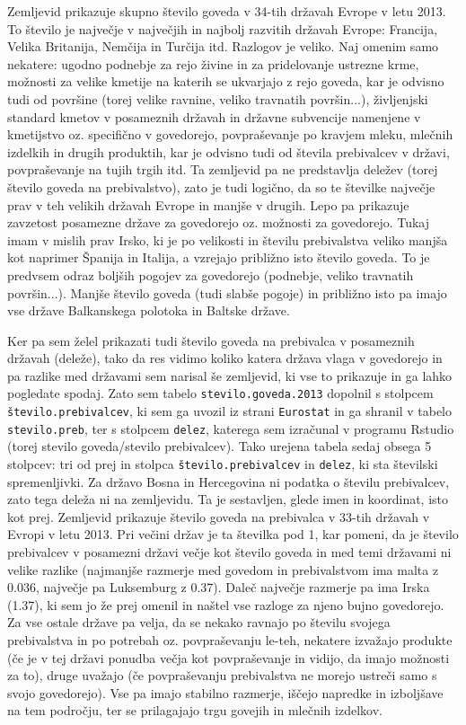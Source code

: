 \documentclass[11pt,a4paper]{article}
\begin{document}
\noindent Zemljevid prikazuje skupno število goveda v 34-tih državah Evrope v letu 2013. To število je največje v največjih in najbolj razvitih državah Evrope: Francija, Velika Britanija, Nemčija in Turčija itd. Razlogov je veliko. Naj omenim samo nekatere: ugodno podnebje za rejo živine in za pridelovanje ustrezne krme, možnosti za velike kmetije na katerih se ukvarjajo z rejo goveda, kar je odvisno tudi od površine (torej velike ravnine, veliko travnatih površin...), življenjski standard kmetov v posameznih državah in državne subvencije namenjene v kmetijstvo oz. specifično v govedorejo, povpraševanje po kravjem mleku, mlečnih izdelkih in drugih produktih, kar je odvisno tudi od števila prebivalcev v državi, povpraševanje na tujih trgih itd. Ta zemljevid pa ne predstavlja deležev (torej število goveda na prebivalstvo), zato je tudi logično, da so te številke največje prav v teh velikih državah Evrope in manjše v drugih. Lepo pa prikazuje zavzetost posamezne države za govedorejo oz. možnosti za govedorejo. Tukaj imam v mislih prav Irsko, ki je po velikosti in številu prebivalstva veliko manjša kot naprimer Španija in Italija, a vzrejajo približno isto število goveda. To je predvsem odraz boljših pogojev za govedorejo (podnebje, veliko travnatih površin...). Manjše število goveda (tudi slabše pogoje) in približno isto pa imajo vse države Balkanskega polotoka in Baltske države.
\newline

\noindent Ker pa sem želel prikazati tudi število goveda na prebivalca v posameznih državah (deleže), tako da res vidimo koliko katera država vlaga v govedorejo in pa razlike med državami sem narisal še zemljevid, ki vse to prikazuje in ga lahko pogledate spodaj. Zato sem tabelo \verb|stevilo.goveda.2013| dopolnil s stolpcem \verb|število.prebivalcev|, ki sem ga uvozil iz strani \verb|Eurostat| in ga shranil v tabelo \verb|stevilo.preb|, ter s stolpcem \verb|delez|, katerega sem izračunal v programu Rstudio (torej stevilo goveda/stevilo prebivalcev). Tako urejena tabela sedaj obsega 5 stolpcev: tri od prej in stolpca \verb|število.prebivalcev| in \verb|delez|, ki sta številski spremenljivki. Za državo Bosna in Hercegovina ni podatka o številu prebivalcev, zato tega deleža ni na zemljevidu. Ta je sestavljen, glede imen in koordinat, isto kot prej.
\newline
Zemljevid prikazuje število goveda na prebivalca v 33-tih državah v Evropi v letu 2013. Pri večini držav je ta številka pod 1, kar pomeni, da je število prebivalcev v posamezni državi večje kot število goveda in med temi državami ni velike razlike (najmanjše razmerje med govedom in prebivalstvom ima malta z 0.036, največje pa Luksemburg z 0.37). Daleč največje razmerje pa ima Irska (1.37), ki sem jo že prej omenil in naštel vse razloge za njeno bujno govedorejo. Za vse ostale države pa velja, da se nekako ravnajo po številu svojega prebivalstva in po potrebah oz. povpraševanju le-teh, nekatere  izvažajo produkte (če je v tej državi ponudba večja kot povpraševanje in vidijo, da imajo možnosti za to), druge uvažajo (če povpraševanju prebivalstva ne morejo ustreči samo s svojo govedorejo). Vse pa imajo stabilno razmerje, iščejo napredke in izboljšave na tem področju, ter se prilagajajo trgu govejih in mlečnih izdelkov.
\end{document}
